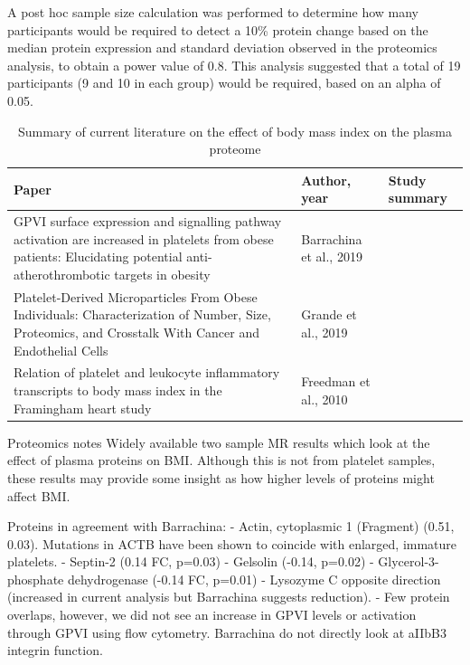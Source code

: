 \documentclass[11pt,twoside]{bristolthesis}
\begin{document}
A post hoc sample size calculation was performed to determine how many participants would be required to detect a 10\% protein change based on the median protein expression and standard deviation observed in the proteomics analysis, to obtain a power value of 0.8. This analysis suggested that a total of 19 participants (9 and 10 in each group) would be required, based on an alpha of 0.05.
\begin{landscape}\begin{table}

\caption{\label{tab:proteome-lit}Summary of current literature on the effect of body mass index on the plasma proteome}
\centering
\begin{tabu} to 
\toprule
Paper & Author, year & Study summary\\
\midrule
GPVI surface expression and signalling pathway activation are increased in platelets from obese patients: Elucidating potential anti-atherothrombotic targets in obesity & Barrachina et al., 2019 & \\
Platelet-Derived Microparticles From Obese Individuals: Characterization of Number, Size, Proteomics, and Crosstalk With Cancer and Endothelial Cells & Grande et al., 2019 & \\
Relation of platelet and leukocyte inflammatory transcripts to body mass index in the Framingham heart study & Freedman et al., 2010 & \\
\bottomrule
\end{tabu}
\end{table}
\end{landscape}
Proteomics notes
Widely available two sample MR results which look at the effect of plasma proteins on BMI. Although this is not from platelet samples, these results may provide some insight as how higher levels of proteins might affect BMI.

Proteins in agreement with Barrachina:
- Actin, cytoplasmic 1 (Fragment) (0.51, 0.03). Mutations in ACTB have been shown to coincide with enlarged, immature platelets.
- Septin-2 (0.14 FC, p=0.03)
- Gelsolin (-0.14, p=0.02)
- Glycerol-3-phosphate dehydrogenase (-0.14 FC, p=0.01)
- Lysozyme C opposite direction (increased in current analysis but Barrachina suggests reduction).
- Few protein overlaps, however, we did not see an increase in GPVI levels or activation through GPVI using flow cytometry. Barrachina do not directly look at aIIbB3 integrin function.
\end{document}
